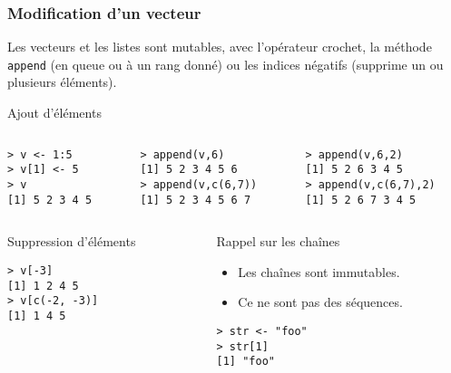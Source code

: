 \documentclass[10pt]{beamer}
\begin{document}
\begin{frame}[fragile]
  \frametitle{Modification d'un vecteur}
  Les vecteurs et les listes sont mutables, avec l'opérateur crochet, la méthode \texttt{append} (en queue ou à un rang donné) ou les indices négatifs (supprime un ou plusieurs éléments).
  \begin{exampleblock}{Ajout d'éléments}
\begin{columns}[t]
\begin{column}{0.33\textwidth}
  \begin{lstlisting}
> v <- 1:5
> v[1] <- 5
> v
[1] 5 2 3 4 5
\end{lstlisting}
\end{column}
\begin{column}{0.33\textwidth}
  \begin{lstlisting}
> append(v,6)
[1] 5 2 3 4 5 6
> append(v,c(6,7))
[1] 5 2 3 4 5 6 7
  \end{lstlisting}
\end{column}
\begin{column}{0.34\textwidth}
  \begin{lstlisting}
> append(v,6,2)
[1] 5 2 6 3 4 5
> append(v,c(6,7),2)
[1] 5 2 6 7 3 4 5
\end{lstlisting}
\end{column}

\end{columns}
\end{exampleblock}


\begin{columns}[t]
\begin{column}{0.43\textwidth}
\begin{exampleblock}{Suppression d'éléments}
  \begin{lstlisting}[style=block]
> v[-3]
[1] 1 2 4 5
> v[c(-2, -3)]
[1] 1 4 5
\end{lstlisting}
\end{exampleblock}
\end{column}
\begin{column}{0.53\textwidth}
  \begin{block}{Rappel sur les chaînes}
    \begin{itemize}
    \item Les chaînes sont immutables.
    \item Ce ne sont pas des séquences.
    \end{itemize}

  \begin{lstlisting}
> str <- "foo"
> str[1]
[1] "foo"
\end{lstlisting}
\end{block}
\end{column}
\end{columns}
\end{frame}
\end{document}
